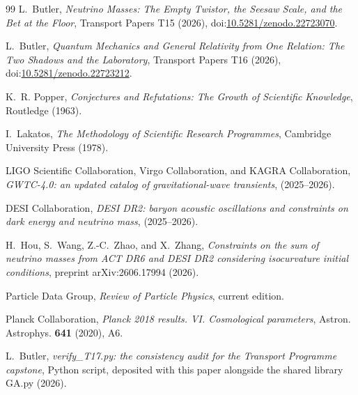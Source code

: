 \documentclass[11pt]{article}
\theoremstyle{definition}
\begin{document}
\begin{thebibliography}{99}
L.~Butler,
\emph{Neutrino Masses: The Empty Twistor, the Seesaw Scale, and the Bet at the Floor},
Transport Papers T15 (2026), doi:\href{https://doi.org/10.5281/zenodo.22723070}{10.5281/zenodo.22723070}.

L.~Butler,
\emph{Quantum Mechanics and General Relativity from One Relation: The Two Shadows and the Laboratory},
Transport Papers T16 (2026), doi:\href{https://doi.org/10.5281/zenodo.22723212}{10.5281/zenodo.22723212}.

K.~R. Popper,
\emph{Conjectures and Refutations: The Growth of Scientific Knowledge},
Routledge (1963).

I.~Lakatos,
\emph{The Methodology of Scientific Research Programmes},
Cambridge University Press (1978).

LIGO Scientific Collaboration, Virgo Collaboration, and KAGRA Collaboration,
\emph{GWTC-4.0: an updated catalog of gravitational-wave transients},
(2025--2026). %

DESI Collaboration,
\emph{DESI DR2: baryon acoustic oscillations and constraints on dark energy and neutrino mass},
(2025--2026). %

H.~Hou, S.~Wang, Z.-C.~Zhao, and X.~Zhang,
\emph{Constraints on the sum of neutrino masses from ACT DR6 and DESI DR2 considering isocurvature initial conditions},
preprint arXiv:2606.17994 (2026). %

Particle Data Group,
\emph{Review of Particle Physics},
current edition. %

Planck Collaboration,
\emph{Planck 2018 results. VI. Cosmological parameters},
Astron. Astrophys. \textbf{641} (2020), A6.

L.~Butler,
\emph{verify\_T17.py: the consistency audit for the Transport Programme capstone},
Python script, deposited with this paper alongside the shared library GA.py (2026).

\end{thebibliography}
\end{document}
